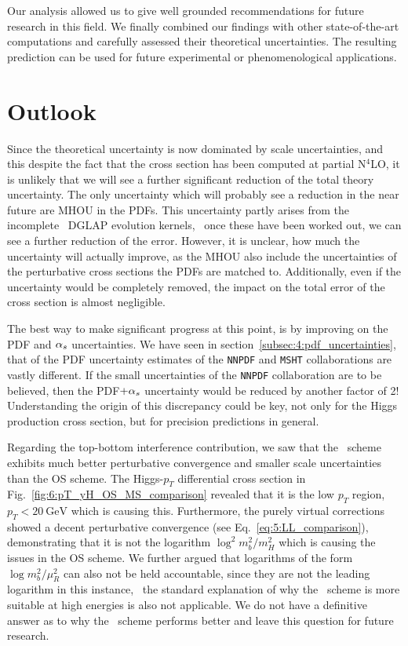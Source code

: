 Our analysis allowed us to give well grounded recommendations for future research in this field. We finally combined our findings with other state-of-the-art computations and carefully assessed their theoretical uncertainties. The resulting prediction can be used for future experimental or phenomenological applications.

\section{Outlook}
Since the theoretical uncertainty is now dominated by scale uncertainties, and this despite the fact that the cross section has been computed at partial N${}^4$LO, it is unlikely that we will see a further significant reduction of the total theory uncertainty. The only uncertainty which will probably see a reduction in the near future are \acs{MHOU} in the \acs{PDF}s. This uncertainty partly arises from the incomplete \NNNLO\ DGLAP evolution kernels, \ie\ once these have been worked out, we can see a further reduction of the error. However, it is unclear, how much the uncertainty will actually improve, as the \acs{MHOU} also include the uncertainties of the perturbative cross sections the \acs{PDF}s are matched to. Additionally, even if the uncertainty would be completely removed, the impact on the total error of the cross section is almost negligible.

The best way to make significant progress at this point, is by improving on the \acs{PDF} and $\alpha_s$ uncertainties. We have seen in section~\ref{subsec:4:pdf_uncertainties}, that of the \acs{PDF} uncertainty estimates of the \texttt{NNPDF} and \texttt{MSHT} collaborations are vastly different. If the small uncertainties of the \texttt{NNPDF} collaboration are to be believed, then the \acs{PDF}$ + \alpha_s$ uncertainty would be reduced by another factor of 2! Understanding the origin of this discrepancy could be key, not only for the Higgs production cross section, but for precision predictions in general.

Regarding the top-bottom interference contribution, we saw that the \MS\ scheme exhibits much better perturbative convergence and smaller scale uncertainties than the \acs{OS} scheme. The Higgs-$p_T$ differential cross section in Fig.~\ref{fig:6:pT_yH_OS_MS_comparison} revealed that it is the low $p_T$ region, \ie\ $p_T< 20\ \mathrm{GeV}$ which is causing this. Furthermore, the purely virtual corrections showed a decent perturbative convergence (see Eq.~\eqref{eq:5:LL_comparison}), demonstrating that it is not the logarithm $\log^2 m_b^2/m_H^2$ which is causing the issues in the \acs{OS} scheme. We further argued that logarithms of the form $\log m_b^2/\mu_R^2$ can also not be held accountable, since they are not the leading logarithm in this instance, \ie\ the standard explanation of why the \MS\ scheme is more suitable at high energies is also not applicable. We do not have a definitive answer as to why the \MS\ scheme performs better and leave this question for future research.

